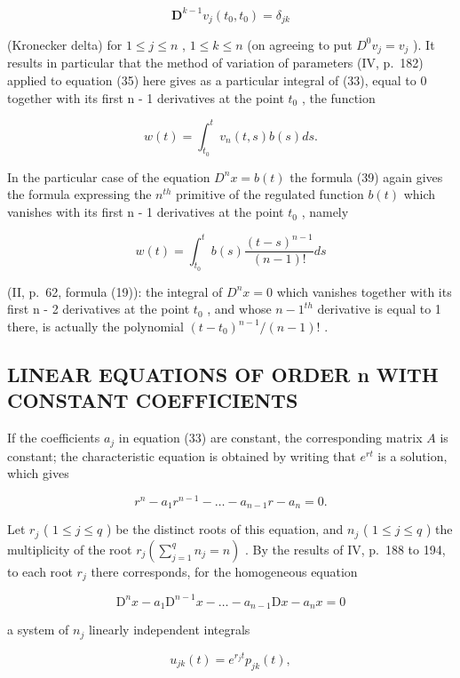 \[
\mathbf {D} ^ {k - 1} v _ {j} (t _ {0}, t _ {0}) = \delta_ {j k}
\]

(Kronecker delta) for \(1 \leqslant j \leqslant n\) , \(1 \leqslant k \leqslant n\) (on agreeing to put \(D^{0}v_{j} = v_{j}\) ). It results in particular that the method of variation of parameters (IV, p.~182) applied to equation (35) here gives as a particular integral of (33), equal to 0 together with its first n - 1 derivatives at the point \(t_{0}\) , the function

\[
w (t) = \int_ {t _ {0}} ^ {t} v _ {n} (t, s) b (s) d s.\tag{39}
\]

In the particular case of the equation \(D^{n}x = b(t)\) the formula (39) again gives the formula expressing the \(n^{th}\) primitive of the regulated function \(b(t)\) which vanishes with its first n - 1 derivatives at the point \(t_{0}\) , namely

\[
w (t) = \int_ {t _ {0}} ^ {t} b (s) \frac {(t - s) ^ {n - 1}}{(n - 1) !} d s
\]

(II, p.~62, formula (19)): the integral of \(D^{n}x = 0\) which vanishes together with its first n - 2 derivatives at the point \(t_{0}\) , and whose \(n - 1^{th}\) derivative is equal to 1 there, is actually the polynomial \((t - t_{0})^{n-1}/(n - 1)!\) .

\subsection{LINEAR EQUATIONS OF ORDER n WITH CONSTANT COEFFICIENTS}

If the coefficients \(a_{j}\) in equation (33) are constant, the corresponding matrix \(A\) is constant; the characteristic equation is obtained by writing that \(e^{rt}\) is a solution, which gives

\[
r ^ {n} - a _ {1} r ^ {n - 1} - \ldots - a _ {n - 1} r - a _ {n} = 0.\tag{40}
\]

Let \(r_j\) ( \(1 \leqslant j \leqslant q\) ) be the distinct roots of this equation, and \(n_j\) ( \(1 \leqslant j \leqslant q\) ) the multiplicity of the root \(r_j \left( \sum_{j=1}^{q} n_j = n \right)\) . By the results of IV, p.~188 to 194, to each root \(r_j\) there corresponds, for the homogeneous equation

\[
\mathrm{D} ^ {n} x - a _ {1} \mathrm{D} ^ {n - 1} x - \dots - a _ {n - 1} \mathrm{D} x - a _ {n} x = 0\tag{41}
\]

a system of \(n_j\) linearly independent integrals

\[
u _ {j k} (t) = e ^ {r _ {j} t} p _ {j k} (t),
\]

